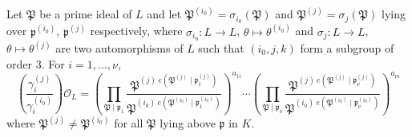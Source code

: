 \begin{lemma}\label{lem:cancellation}
Let $\mathfrak{P}$ be a prime ideal of $L$ and let $\mathfrak{P}^{(i_0)} = \sigma_{i_0}(\mathfrak{P})$ and $\mathfrak{P}^{(j)} = \sigma_{j}(\mathfrak{P})$ lying over $\mathfrak{p}^{(i_0)}$, $\mathfrak{p}^{(j)}$ respectively, where $\sigma_{i_0}: L \to L$, $\theta \mapsto \theta^{(i_0)}$ and $\sigma_{j}: L \to L$, $\theta \mapsto \theta^{(j)}$ are two automorphisms of $L$ such that $(i_0,j,k)$ form a subgroup of order $3$. For $i = 1, \dots, \nu$, 
\[\left( \frac{\gamma_i^{(j)}}{\gamma_i^{(i_0)}}\right)\mathcal{O}_L 
	 = \left(\prod_{\mathfrak{P}\mid\mathfrak{p}_1} \frac{\mathfrak{P}^{(j) \ e(\mathfrak{P}^{(j)}\mid\mathfrak{p}_1^{(j)})}}{\mathfrak{P}^{(i_0) \ e(\mathfrak{P}^{(i_0)}\mid\mathfrak{p}^{(i_0)}_1)}}\right)^{a_{1i}} \cdots \left(\prod_{\mathfrak{P}\mid\mathfrak{p}_{\nu}} \frac{\mathfrak{P}^{(j) \ e(\mathfrak{P}^{(j)}\mid\mathfrak{p}^{(j)}_{\nu})}}{\mathfrak{P}^{(i_0) \ e(\mathfrak{P}^{(i_0)}\mid\mathfrak{p}^{(i_0)}_{\nu})}}\right)^{a_{\nu i}}\]
where $\mathfrak{P}^{(j)} \neq \mathfrak{P}^{(i_0)}$ for all $\mathfrak{P}$ lying above $\mathfrak{p}$ in $K$. 
\end{lemma}

